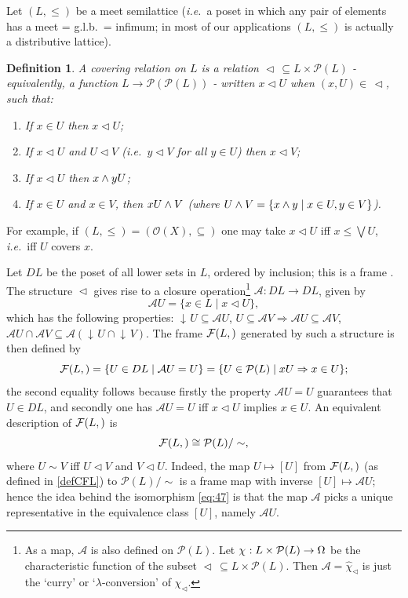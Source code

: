 \documentclass[11pt]{article}
\newcommand{\downset}{\ensuremath{\mathop{\downarrow\!}}}
\newcommand{\drie}{\vartriangleleft}
\newcommand{\beq}{\begin{equation}}
\newcommand{\eeq}{\end{equation}}
\newcommand{\raw}{\rightarrow} \newcommand{\rat}{\mapsto}
\newcommand{\x}{\times} \newcommand{\hb}{\hbar}
\newcommand{\er}{\eqref}
\newcommand{\lm}{\lambda} \newcommand{\Lm}{\Lambda}
\newcommand{\ch}{\chi} \newcommand{\ps}{\psi} \newcommand{\Ps}{\Psi}
\newcommand{\CO}{{\mathcal O}} \newcommand{\CP}{{\mathcal P}}
\newcommand{\ie}{\textit{i.e.}}
\newtheorem{definition}[theorem]{Definition}
\begin{document}
Let $(L,\leqslant)$  be a meet semilattice (\ie\ a poset in which any pair of elements has a meet = g.l.b.\ = infimum; in most of our applications $(L,\leqslant)$ is actually a distributive lattice).
\begin{definition}\label{def:cover}
A {\it covering relation} on $L$ is a relation $\drie\,\subseteq L\x\CP(L)$ -
equivalently, a function $L\raw \CP(\CP(L))$ -
 written $x\drie U$ when $(x,U)\in\,\drie$, such that:
 \begin{enumerate}
\item If $x\in U$ then $x\drie U$;
\item If $x\drie U$ and $U\drie V$ (\ie\ $y\drie V$ for all $y\in U$) then $x\drie V$;
\item If $x\drie U$ then $x\wed y\drie U$;
\item If  $x\in U$ and  $x\in V$, then $x\drie U\wed V$ (where $U\wedge V=\{x\wedge y\mid x\in U, y\in V\}$).
\end{enumerate}
\end{definition}
For example, if $(L,\leqslant)=(\CO(X),\subseteq)$ one may take $x\drie U$ iff $x\leqslant\bigvee U$, \ie\ iff $U$ covers
$x$.

Let  $DL$ be the poset of all lower sets in $L$, ordered by inclusion; this is a frame \cite[\S 1.2]{johnstone82}. 
The structure $\drie$ gives rise to a closure operation\footnote{As a map, $\mathcal{A}$ is also defined on $\CP(L)$. 
Let $\ch_{\drie}:L\x\CP(L)\raw\Om$
be the characteristic function of the subset $\drie\,\subseteq L\x\CP(L)$. Then $\mathcal{A}=\hat{\ch}_{\drie}$ is just the `curry' or `$\lm$-conversion' of $\ch_{\drie}$.}
$\mathcal{A}: DL\raw DL$,  given by
\beq \mathcal{A} U=\{x\in L\mid x\drie U\}, \label{clop}\eeq
which has the following properties: $\downset U\subseteq \mathcal{A}U$,
$U\subseteq \mathcal{A}V\Rightarrow \mathcal{A}U\subseteq \mathcal{A}V$,
  $\mathcal{A}U\cap \mathcal{A}V\subseteq \mathcal{A}(\downset U \cap \downset V)$.   The frame $\CF(L,\drie)$ generated by such a structure is then defined by
\beq \CF(L,\drie)=\{U\in DL\mid \mathcal{A}U=U\}=\{U\in \CP(L)\mid x\drie U\Raw x\in U\};
\label{defCFL}
\eeq
the second equality follows because firstly  the property $\mathcal{A}U=U$ guarantees that $U\in DL$, and secondly one has $\mathcal{A}U=U$ iff  $x\drie U$ implies  $x\in U$.
An equivalent description of  $\CF(L,\drie)$ is
\beq \CF(L,\drie)\cong
\CP(L)/\sim,\label{eq:47} \eeq
 where $U\sim V$ iff $U\drie V$ and  $V\drie U$.  Indeed, the map $U\mapsto [U]$ from
 $ \CF(L,\drie)$ (as defined in \er{defCFL}) to $\CP(L)/\sim$ is a frame map with inverse
 $[U]\mapsto \mathcal{A}U$; hence the idea behind the isomorphism \er{eq:47} is that the map $\mathcal{A}$ picks a unique representative 
 in the equivalence class $[U]$, namely $\mathcal{A}U$.
 
\end{document}
